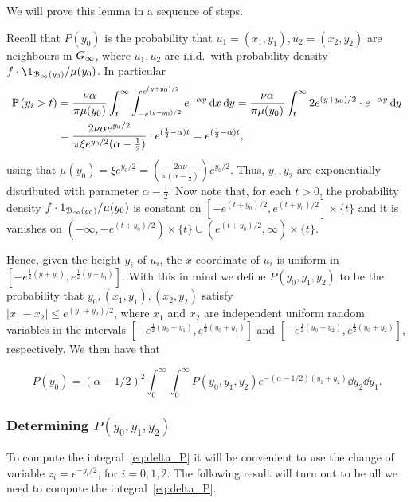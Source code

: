 We will prove this lemma in a sequence of steps.

Recall that $P(y_0)$ is the probability that $u_1 = (x_1,y_1), u_2 = (x_2,y_2)$ are neighbours in $G_{\infty}$, where
$u_1, u_2$ are i.i.d.~with probability density $f \cdot \1_{\BallPo{y_0}} / \mu(y_0)$.
In particular
\begin{align*}
	\mathbb{P}\left(y_i > t\right) &= \frac{\nu\alpha}{\pi \mu(y_0)} \int_t^\infty \int_{-e^{(y+y_0)/2}}^{e^{(y+y_0)/2}} e^{-\alpha y}
		\operatorname{\mathrm{d}\hspace{-2pt}} x \operatorname{\mathrm{d}\hspace{-2pt}} y
		= \frac{\nu\alpha}{\pi \mu(y_0)} \int_t^\infty 2 e^{(y+y_0)/2} \cdot e^{-\alpha y} \operatorname{\mathrm{d}\hspace{-2pt}} y \\
	&= \frac{2 \nu\alpha e^{y_0/2} }{\pi \xi e^{y_0/2} (\alpha-\frac{1}{2}) }  \cdot e^{(\frac{1}{2}-\alpha)t}
		= e^{(\frac{1}{2}-\alpha)t},
\end{align*}
using that $\mu(y_0) = \xi e^{y_0/2} = \left(\frac{2\alpha\nu}{\pi(\alpha-\frac12)}\right) e^{y_0/2}$.
Thus, $y_1, y_2$ are exponentially distributed with parameter $\alpha-\frac12$.
Now note that, for each $t>0$, the probability density $f \cdot 1_{{\mathcal B}_{\infty}\left(y_0\right)} / \mu(y_0)$
is constant on $[-e^{(t+y_0)/2}, e^{(t+y_0)/2}] \times \{t\}$ and it is 
vanishes on $(-\infty, -e^{(t+y_0)/2}) \times \{t\} \cup (e^{(t+y_0)/2},\infty)\times\{t\}$.

Hence, given the height $y_i$ of $u_i$, the $x$-coordinate of $u_i$ is uniform in $[-e^{\frac{1}{2}(y+y_i)},e^{\frac{1}{2}(y+y_i)}]$. 
With this in mind we define $P(y_0,y_1,y_2)$ to be the probability that $y_0, (x_1,y_1), (x_2,y_2)$ 
satisfy \\ $|x_1-x_2| \leq e^{(y_1+y_2)/2}$, where $x_1$ and $x_2$ are independent uniform random variables in the intervals
$[-e^{\frac{1}{2}(y_0+y_1)},e^{\frac{1}{2}(y_0+y_1)}]$ and  $[-e^{\frac{1}{2}(y_0+y_2)},e^{\frac{1}{2}(y_0+y_2)}]$, respectively. We then have that

\begin{equation}\label{eq:delta_P}
 P(y_0) = (\alpha-1/2)^2 \int_0^\infty \int_0^\infty P(y_0, y_1, y_2) e^{-(\alpha-1/2)(y_1+y_2)} 
 \dd y_2 \dd y_1.
\end{equation}

\subsubsection{Determining \texorpdfstring{$P(y_0,y_1,y_2)$}{P(y0,y1,y2)}}


To compute the integral~\eqref{eq:delta_P} it will be convenient to use the 
change of variable $z_i = e^{-y_i/2}$, for $i= 0, 1, 2$. 
The following result will turn out to be
all we need to compute the integral~\eqref{eq:delta_P}.

